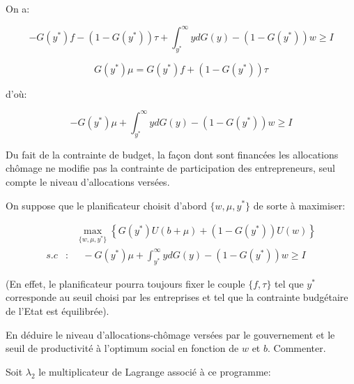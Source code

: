 \documentclass[a4paper]{article}
\begin{document}
On a:

\begin{equation*}
-G(y^{\ast })f-\left( 1-G(y^{\ast })\right) \tau +\int_{y^{\ast }}^{\infty
}ydG(y)-\left( 1-G(y^{\ast })\right) w\geq I
\end{equation*}

\begin{equation*}
G(y^{\ast })\mu =G(y^{\ast })f+\left( 1-G(y^{\ast })\right) \tau
\end{equation*}

d'o\`{u}:

\begin{equation*}
-G(y^{\ast })\mu +\int_{y^{\ast }}^{\infty }ydG(y)-\left( 1-G(y^{\ast
})\right) w\geq I
\end{equation*}

Du fait de la contrainte de budget, la fa\c{c}on dont sont financ\'{e}es les
allocations ch\^{o}mage ne modifie pas la contrainte de participation des
entrepreneurs, seul compte le niveau d'allocations vers\'{e}es.

\bigskip

On suppose que le planificateur choisit d'abord $\{w,\mu ,y^{\ast }\}$ de
sorte \`{a} maximiser:

\begin{eqnarray*}
&&\max_{\{w,\mu ,y^{\ast }\}}\left\{ G(y^{\ast })U(b+\mu )+\left(
1-G(y^{\ast })\right) U(w)\right\} \\
s.c &:&\text{ }-G(y^{\ast })\mu +\int_{y^{\ast }}^{\infty }ydG(y)-\left(
1-G(y^{\ast })\right) w\geq I
\end{eqnarray*}

(En effet, le planificateur pourra toujours fixer le couple $\{f,\tau \}$
tel que $y^{\ast }$ corresponde au seuil choisi par les entreprises et tel
que la contrainte budg\'{e}taire de l'Etat est \'{e}quilibr\'{e}e).

En d\'{e}duire le niveau d'allocations-ch\^{o}mage vers\'{e}es par le
gouvernement et le seuil de productivit\'{e} \`{a} l'optimum social en
fonction de $w$ et $b$. Commenter.

\bigskip

Soit $\lambda _{2}$ le multiplicateur de Lagrange associ\'{e} \`{a} ce
programme:
\end{document}
